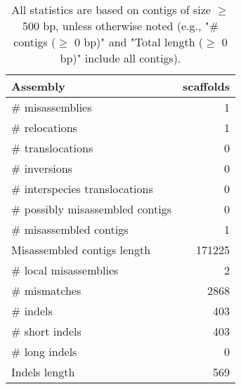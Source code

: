 \documentclass[12pt,a4paper]{article}
\begin{document}
\begin{table}[ht]
\begin{center}
\caption{All statistics are based on contigs of size $\geq$ 500 bp, unless otherwise noted (e.g., "\# contigs ($\geq$ 0 bp)" and "Total length ($\geq$ 0 bp)" include all contigs).}
\begin{tabular}{|l*{1}{|r}|}
\hline
Assembly & scaffolds \\ \hline
\# misassemblies & 1 \\ \hline
\hspace{5mm}\# relocations & 1 \\ \hline
\hspace{5mm}\# translocations & 0 \\ \hline
\hspace{5mm}\# inversions & 0 \\ \hline
\hspace{5mm}\# interspecies translocations & 0 \\ \hline
\# possibly misassembled contigs & 0 \\ \hline
\# misassembled contigs & 1 \\ \hline
Misassembled contigs length & 171225 \\ \hline
\# local misassemblies & 2 \\ \hline
\# mismatches & 2868 \\ \hline
\# indels & 403 \\ \hline
\hspace{5mm}\# short indels & 403 \\ \hline
\hspace{5mm}\# long indels & 0 \\ \hline
Indels length & 569 \\ \hline
\end{tabular}
\end{center}
\end{table}
\end{document}
